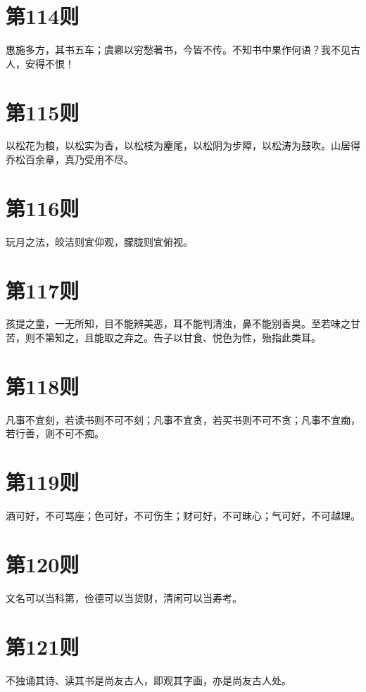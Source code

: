 \documentclass[12pt,a4paper]{ctexbook}
\begin{document}
\section{第114则}
惠施多方，其书五车；虞卿以穷愁著书，今皆不传。不知书中果作何语？我不见古人，安得不恨！\par

\section{第115则}
以松花为粮，以松实为香，以松枝为麈尾，以松阴为步障，以松涛为鼓吹。山居得乔松百余章，真乃受用不尽。\par

\section{第116则}
玩月之法，皎洁则宜仰观，朦胧则宜俯视。\par

\section{第117则}
孩提之童，一无所知，目不能辨美恶，耳不能判清浊，鼻不能别香臭。至若味之甘苦，则不第知之，且能取之弃之。告子以甘食、悦色为性，殆指此类耳。\par

\section{第118则}
凡事不宜刻，若读书则不可不刻；凡事不宜贪，若买书则不可不贪；凡事不宜痴，若行善，则不可不痴。\par

\section{第119则}
酒可好，不可骂座；色可好，不可伤生；财可好，不可昧心；气可好，不可越理。\par

\section{第120则}
文名可以当科第，俭德可以当货财，清闲可以当寿考。\par

\section{第121则}
不独诵其诗、读其书是尚友古人，即观其字画，亦是尚友古人处。\par
\end{document}
